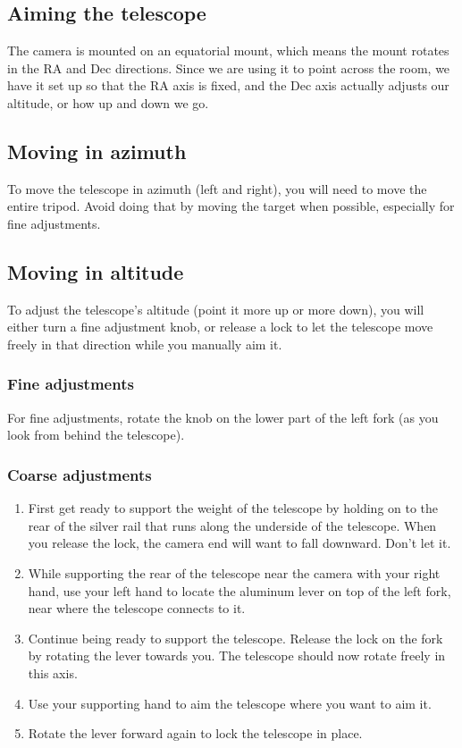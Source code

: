 \documentclass{article}
\begin{document}
\subsection{Aiming the telescope}

The camera is mounted on an equatorial mount, which means the mount rotates in the RA and Dec directions. Since we are using it to point across the room, we have it set up so that the RA axis is fixed, and the Dec axis actually adjusts our altitude, or how up and down we go.

\subsection{Moving in azimuth}

To move the telescope in azimuth (left and right), you will need to move the entire tripod. Avoid doing that by moving the target when possible, especially for fine adjustments.

\subsection{Moving in altitude}

To adjust the telescope's altitude (point it more up or more down), you will either turn a fine adjustment knob, or release a lock to let the telescope move freely in that direction while you manually aim it.

\subsubsection{Fine adjustments}

For fine adjustments, rotate the knob on the lower part of the left fork (as you look from behind the telescope).

\subsubsection{Coarse adjustments}

\begin{enumerate}
	\item First get ready to support the weight of the telescope by holding on to the rear of the silver rail that runs along the underside of the telescope. When you release the lock, the camera end will want to fall downward. Don't let it.
	
	\item While supporting the rear of the telescope near the camera with your right hand, use your left hand to locate the aluminum lever on top of the left fork, near where the telescope connects to it.
	
	\item Continue being ready to support the telescope. Release the lock on the fork by rotating the lever towards you. The telescope should now rotate freely in this axis.
	
	\item Use your supporting hand to aim the telescope where you want to aim it.
	
	\item Rotate the lever forward again to lock the telescope in place.
\end{enumerate}
\end{document}
